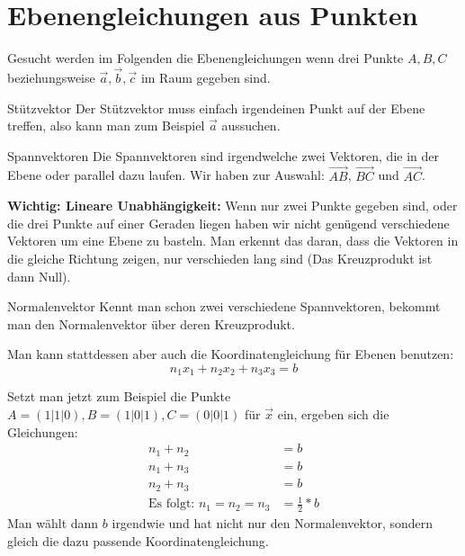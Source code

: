\section{Ebenengleichungen aus Punkten}
Gesucht werden im Folgenden die Ebenengleichungen wenn drei Punkte $A,B,C$ beziehungsweise $\vec{a}, \vec{b}, \vec{c}$ im Raum gegeben sind.

\begin{bla}{Stützvektor}
  Der Stützvektor muss einfach irgendeinen Punkt auf der Ebene treffen, also kann man zum Beispiel $\vec{a}$ aussuchen.
\end{bla}

\begin{bla}{Spannvektoren}
  Die Spannvektoren sind irgendwelche zwei Vektoren, die in der Ebene oder parallel dazu laufen. Wir haben zur Auswahl: $\overrightarrow{AB}$, $\overrightarrow{BC}$ und $\overrightarrow{AC}$.

  \textbf{Wichtig: Lineare Unabhängigkeit:} Wenn nur zwei Punkte gegeben sind, oder die drei Punkte auf einer Geraden liegen haben wir nicht genügend verschiedene Vektoren um eine Ebene zu basteln.
  Man erkennt das daran, dass die Vektoren in die gleiche Richtung zeigen, nur verschieden lang sind
  (Das Kreuzprodukt ist dann Null).
\end{bla}

\begin{bla}{Normalenvektor}
  Kennt man schon zwei verschiedene Spannvektoren, bekommt man den Normalenvektor über deren Kreuzprodukt.

  Man kann stattdessen aber auch die Koordinatengleichung für Ebenen benutzen:
  \begin{equation*}
    n_1x_1 + n_2x_2 + n_3x_3 = b
  \end{equation*}

  

  Setzt man jetzt zum Beispiel die Punkte $A=(1|1|0), B=(1|0|1), C=(0|0|1)$ für $\vec{x}$ ein, ergeben sich die Gleichungen:
  \begin{align*}
    n_1 + n_2 &= b \\
    n_1 + n_3 &= b \\
    n_2 + n_3 &= b \\
    \text{Es folgt: } n_1 = n_2 = n_3 &= \frac{1}{2} * b
  \end{align*}
  Man wählt dann $b$ irgendwie und hat nicht nur den Normalenvektor, sondern gleich die dazu passende Koordinatengleichung.
\end{bla}

